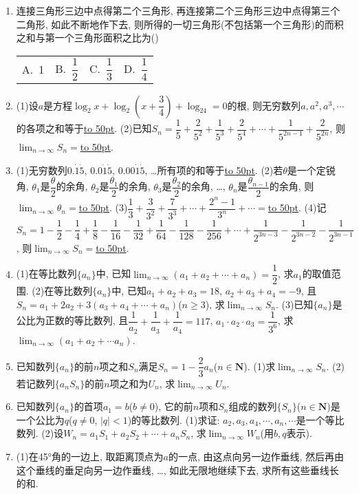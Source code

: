 \documentclass[10pt,a4paper]{article}
\newcommand{\blank}[1]{\underline{\hbox to #1pt{}}}
\newcommand{\fourch}[4]{\par\begin{tabular}{p{.23\textwidth}p{.23\textwidth}p{.23\textwidth}p{.23\textwidth}}
A.~#1 &B.~#2& C.~#3& D.~#4
\end{tabular}}
\begin{document}
\begin{enumerate}[1.]
\fourch{6}{5}{3}{2}
\item 连接三角形三边中点得第二个三角形, 再连接第二个三角形三边中点得第三个二角形, 如此不断地作下去, 则所得的一切三角形(不包括第一个三角形)的而积之和与第一个三角形面积之比为()
\fourch{1}{$\dfrac 12$}{$\dfrac 13$}{$\dfrac 14$}
\item (1)设$a$是方程$\log _2x+\log _2(x+\dfrac 34)+\log _24=0$的根, 则无穷数列$a,a^2,a^3,\cdots$的各项之和等于\blank{50}.
(2)已知$S_n=\dfrac 15+\dfrac 2{5^2}+\dfrac 1{5^3}+\dfrac 2{5^4}+\cdots +\dfrac 1{5^{2n-1}}+\dfrac 2{5^{2n}}$, 则$\displaystyle \lim_{n\to \infty} S_n=$\blank{50}.
\item (1)无穷数列$0.\dot1\dot5$, $0.0\dot1\dot5$, $0.00\dot1\dot5$, …所有项的和等于\blank{50}.
(2)若$\theta$是一个定锐角, $\theta _1$是$\dfrac{\theta }2$的余角, $\theta _2$是$\dfrac{\theta _1}2$的余角, $\theta _3$是$\dfrac{\theta _2}2$的余角, …, $\theta _n$是$\dfrac{\theta _{n-1}}2$的余角, 则$\displaystyle \lim_{n\to \infty} \theta _n=$\blank{50}.
(3)$\dfrac 13+\dfrac 3{3^2}+\dfrac 7{3^3}+\cdots +\dfrac{{2^n}-1}{3^n}+\cdots =$\blank{50}.
(4)记$S_n=1-\dfrac 12-\dfrac 14+\dfrac 18-\dfrac 1{16}-\dfrac 1{32}+\dfrac 1{64}-\dfrac 1{128}-\dfrac 1{256}+\cdots +\dfrac 1{2^{3n-3}}-\dfrac 1{2^{3n-2}}-\dfrac 1{2^{3n-1}}$, 则$\displaystyle \lim_{n\to \infty} S_n=$\blank{50}.
\item (1)在等比数列$\{a_n\}$中, 已知$\displaystyle \lim_{n\to \infty} (a_1+a_2+\cdots +a_n)=\dfrac 12$, 求$a_1$的取值范围.
(2)在等比数列$\{a_n\}$中, 已知$a_1+a_2+a_3=18$, $a_2+a_3+a_4=-9$, 且$S_n=a_1+2a_2+3(a_3+a_4+\cdots +a_n)$($n\ge 3$), 求$\displaystyle \lim_{n\to \infty} S_n$.
(3)已知$\{a_n\}$是公比为正数的等比数列, 且$\dfrac 1{a_2}+\dfrac 1{a_3}+\dfrac 1{a_4}=117$, $a_1\cdot a_2\cdot a_3=\dfrac 1{3^6}$, 求$\displaystyle \lim_{n\to \infty} (a_1+a_2+\cdots a_n)$.
\item 已知数列$\{a_n\}$的前$n$项之和$S_n$满足$S_n=1-\dfrac 23a_n$($n\in \mathbf{N}$).
(1)求$\displaystyle \lim_{n\to \infty} S_n$.
(2)若记数列$\{a_nS_n\}$的前$n$项之和为$U_n$, 求$\displaystyle \lim_{n\to \infty} U_n$.
\item 已知数列$\{a_n\}$的首项$a_1=b$($b\ne 0$), 它的前$n$项和$S_n$组成的数列$\{S_n\}$($n\in \mathbf{N}$)是一个公比为$q$($q\ne 0$, $|q|<1$)的等比数列.
(1)求证: $a_2,a_3,a_4,\cdots ,a_n,\cdots$是一个等比数列.
(2)设$W_n=a_1S_1+a_2S_2+\cdots +a_nS_n$, 求$\displaystyle \lim_{n\to \infty} W_n$(用$b,q$表示).
\item (1)在45°角的一边上, 取距离顶点为$a$的一点, 由这点向另一边作垂线, 然后再由这个垂线的垂足向另一边作垂线, …, 如此无限地继续下去, 求所有这些垂线长的和.

\end{enumerate}
\end{document}
